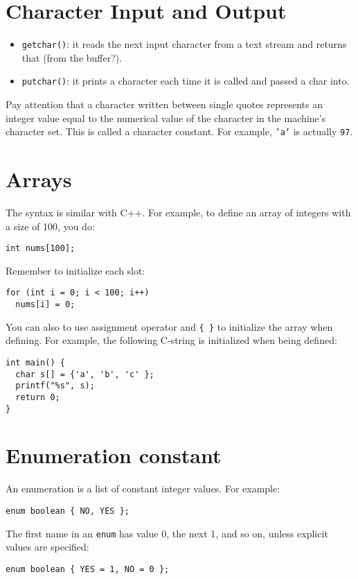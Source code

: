 \documentclass[12pt]{article}
\begin{document}
\section{Character Input and Output}
\label{sec:orgfbd63ca}
\begin{itemize}
\item \texttt{getchar()}: it reads the next input character from a text stream and returns that (from the buffer?).
\item \texttt{putchar()}: it prints a character each time it is called and passed a char into.
\end{itemize}

Pay attention that a character written between single quotes represents an integer value equal to the numerical value of the character in the machine's character set. This is called a character constant. For example, \texttt{'a'} is actually \texttt{97}.
\section{Arrays}
\label{sec:orgf528e96}
The syntax is similar with C++. For example, to define an array of integers with a size of 100, you do:
\begin{verbatim}
int nums[100];
\end{verbatim}
Remember to initialize each slot:
\begin{verbatim}
for (int i = 0; i < 100; i++)
  nums[i] = 0;
\end{verbatim}

You can also to use assignment operator and \texttt{\{ \}} to initialize the array when defining. For example, the following C-string is initialized when being defined:
\begin{verbatim}
int main() {
  char s[] = {'a', 'b', 'c' };
  printf("%s", s);
  return 0;
}
\end{verbatim}
\section{Enumeration constant}
\label{sec:org6cf8e8d}
An enumeration is a list of constant integer values. For example:
\begin{verbatim}
enum boolean { NO, YES };
\end{verbatim}
The first name in an \texttt{enum} has value 0, the next 1, and so on, unless explicit values are specified:
\begin{verbatim}
enum boolean { YES = 1, NO = 0 };
\end{verbatim}
\end{document}
